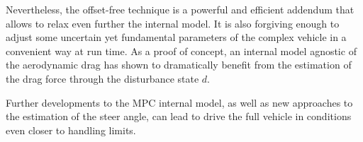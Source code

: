\documentclass[conference]{IEEEtran} %
\begin{document}
Nevertheless, the offset-free technique is a powerful and efficient addendum that allows to relax even further the internal model. It is also forgiving enough to adjust some uncertain yet fundamental parameters of the complex vehicle in a convenient way at run time.
As a proof of concept, an internal model agnostic of the aerodynamic drag has shown to dramatically benefit from the estimation of the drag force through the disturbance state $d$.

Further developments to the MPC internal model, as well as new approaches to the estimation of the steer angle, can lead to drive the full vehicle in conditions even closer to handling limits.
\label{sec:conclusion}





\end{document}
